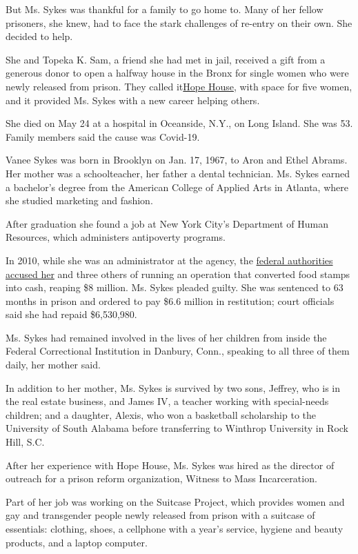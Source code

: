 But Ms. Sykes was thankful for a family to go home to. Many of her
fellow prisoners, she knew, had to face the stark challenges of re-entry
on their own. She decided to help.

She and Topeka K. Sam, a friend she had met in jail, received a gift
from a generous donor to open a halfway house in the Bronx for single
women who were newly released from prison. They called
it\href{https://www.nytimes.com/2017/12/27/nyregion/a-house-for-women-leaving-prison-sits-empty.html}{Hope
House}, with space for five women, and it provided Ms. Sykes with a new
career helping others.

She died on May 24 at a hospital in Oceanside, N.Y., on Long Island. She
was 53. Family members said the cause was Covid-19.

Vanee Sykes was born in Brooklyn on Jan. 17, 1967, to Aron and Ethel
Abrams. Her mother was a schoolteacher, her father a dental technician.
Ms. Sykes earned a bachelor's degree from the American College of
Applied Arts in Atlanta, where she studied marketing and fashion.

After graduation she found a job at New York City's Department of Human
Resources, which administers antipoverty programs.

In 2010, while she was an administrator at the agency, the
\href{https://www.nytimes.com/2010/12/09/nyregion/09hra.html}{federal
authorities accused her} and three others of running an operation that
converted food stamps into cash, reaping \$8 million. Ms. Sykes pleaded
guilty. She was sentenced to 63 months in prison and ordered to pay
\$6.6 million in restitution; court officials said she had repaid
\$6,530,980.

Ms. Sykes had remained involved in the lives of her children from inside
the Federal Correctional Institution in Danbury, Conn., speaking to all
three of them daily, her mother said.

In addition to her mother, Ms. Sykes is survived by two sons, Jeffrey,
who is in the real estate business, and James IV, a teacher working with
special-needs children; and a daughter, Alexis, who won a basketball
scholarship to the University of South Alabama before transferring to
Winthrop University in Rock Hill, S.C.

After her experience with Hope House, Ms. Sykes was hired as the
director of outreach for a prison reform organization, Witness to Mass
Incarceration.

Part of her job was working on the Suitcase Project, which provides
women and gay and transgender people newly released from prison with a
suitcase of essentials: clothing, shoes, a cellphone with a year's
service, hygiene and beauty products, and a laptop computer.

